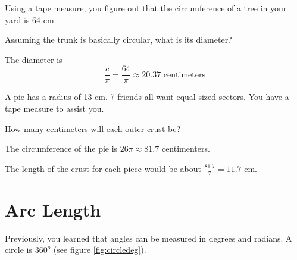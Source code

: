 \begin{Exercise}[title={Circumference}, label=circumference]

  Using a tape measure, you figure out that the circumference of a tree in your
  yard is 64 cm.

  Assuming the trunk is basically circular,  what is its diameter?
  
\end{Exercise}
\begin{Answer}[ref=circumference]

  The diameter is $$\frac{c}{\pi} = \frac{64}{\pi} \approx 20.37 \text{ 
  centimeters}$$
  
\end{Answer}
\begin{Exercise}[title={Splitting a Pie}, label=pie_splitting]

  A pie has a radius of 13 cm.  7 friends all want equal sized sectors.  You 
  have a tape measure to assist you.

  How many centimeters will each outer crust be?

\end{Exercise}
\begin{Answer}[ref=pie_splitting]

  The circumference of the pie is $26 \pi \approx 81.7$ centimenters.
  
  The length of the crust for each piece would be about $\frac{81.7}{7} = 11.7$
  cm.

  
\end{Answer}

\section{Arc Length}
Previously, you learned that angles can be measured in degrees and radians. A 
circle is $360^o$ (see figure \ref{fig:circledeg}). 

